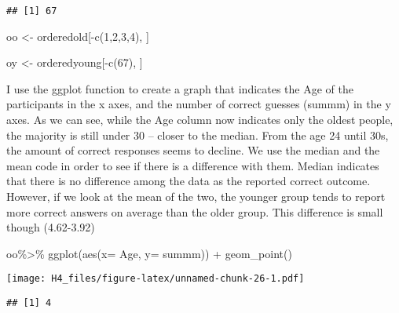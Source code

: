 \documentclass[
]{article}
\newenvironment{Shaded}{\begin{snugshade}}{\end{snugshade}}
\newcommand{\AttributeTok}[1]{\textcolor[rgb]{0.77,0.63,0.00}{#1}}
\newcommand{\DecValTok}[1]{\textcolor[rgb]{0.00,0.00,0.81}{#1}}
\newcommand{\FunctionTok}[1]{\textcolor[rgb]{0.00,0.00,0.00}{#1}}
\newcommand{\NormalTok}[1]{#1}
\newcommand{\OtherTok}[1]{\textcolor[rgb]{0.56,0.35,0.01}{#1}}
\newcommand{\SpecialCharTok}[1]{\textcolor[rgb]{0.00,0.00,0.00}{#1}}
\begin{document}
\begin{verbatim}
## [1] 67
\end{verbatim}

\begin{Shaded}
\begin{Highlighting}[]
\NormalTok{oo }\OtherTok{\textless{}{-}}\NormalTok{ orderedold[}\SpecialCharTok{{-}}\FunctionTok{c}\NormalTok{(}\DecValTok{1}\NormalTok{,}\DecValTok{2}\NormalTok{,}\DecValTok{3}\NormalTok{,}\DecValTok{4}\NormalTok{), ]}

\NormalTok{oy }\OtherTok{\textless{}{-}}\NormalTok{ orderedyoung[}\SpecialCharTok{{-}}\FunctionTok{c}\NormalTok{(}\DecValTok{67}\NormalTok{), ]}
\end{Highlighting}
\end{Shaded}

I use the ggplot function to create a graph that indicates the Age of
the participants in the x axes, and the number of correct guesses
(summm) in the y axes. As we can see, while the Age column now indicates
only the oldest people, the majority is still under 30 -- closer to the
median. From the age 24 until 30s, the amount of correct responses seems
to decline. We use the median and the mean code in order to see if there
is a difference with them. Median indicates that there is no difference
among the data as the reported correct outcome. However, if we look at
the mean of the two, the younger group tends to report more correct
answers on average than the older group. This difference is small though
(4.62-3.92)

\begin{Shaded}
\begin{Highlighting}[]
\NormalTok{oo}\SpecialCharTok{\%\textgreater{}\%} \FunctionTok{ggplot}\NormalTok{(}\FunctionTok{aes}\NormalTok{(}\AttributeTok{x=}\NormalTok{ Age, }\AttributeTok{y=}\NormalTok{ summm)) }\SpecialCharTok{+} \FunctionTok{geom\_point}\NormalTok{()}
\end{Highlighting}
\end{Shaded}

\texttt{[image: H4\_files/figure-latex/unnamed-chunk-26-1.pdf]}

\begin{Shaded}
\end{Shaded}

\begin{verbatim}
## [1] 4
\end{verbatim}
\end{document}
